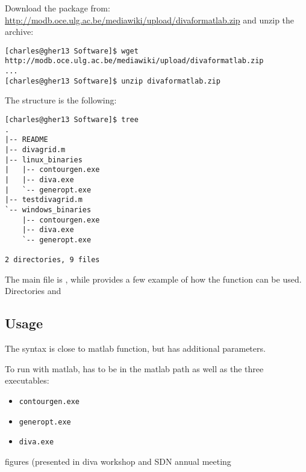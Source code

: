 Download the package from: \url{http://modb.oce.ulg.ac.be/mediawiki/upload/divaformatlab.zip}
and unzip the archive:
\begin{lstlisting}[style=Bash]
[charles@gher13 Software]$ wget http://modb.oce.ulg.ac.be/mediawiki/upload/divaformatlab.zip
...
[charles@gher13 Software]$ unzip divaformatlab.zip
\end{lstlisting}

The structure is the following:
\begin{lstlisting}[style=Bash]
[charles@gher13 Software]$ tree
.
|-- README
|-- divagrid.m
|-- linux_binaries
|   |-- contourgen.exe
|   |-- diva.exe
|   `-- generopt.exe
|-- testdivagrid.m
`-- windows_binaries
    |-- contourgen.exe
    |-- diva.exe
    `-- generopt.exe

2 directories, 9 files
\end{lstlisting}

The main file is , while  provides a few example of how the function can be used.
Directories  and 
 
\subsection{Usage}

The syntax  is close to matlab  function, but has additional parameters.

To run \diva with matlab,  has to be in the matlab path as well as the three executables:
\begin{itemize}
\item \texttt{contourgen.exe}
\item \texttt{generopt.exe}
\item \texttt{diva.exe}
\end{itemize}


figures (presented in diva workshop and SDN annual meeting
